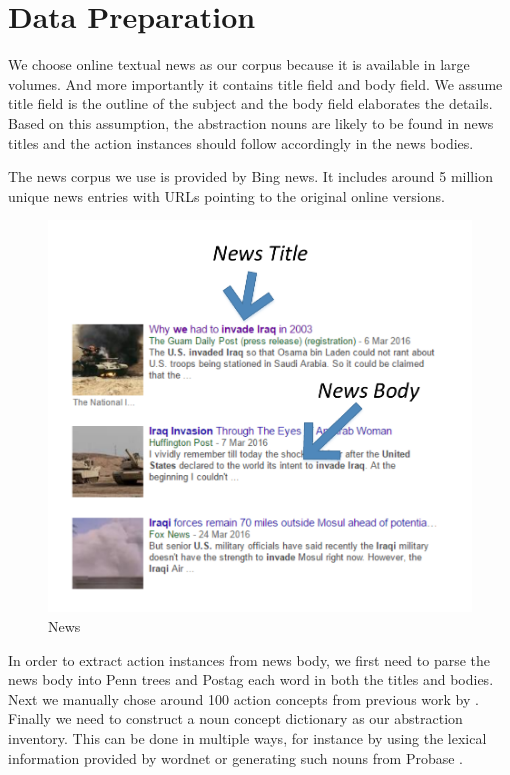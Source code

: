 \section{Data Preparation}
We choose online textual news as our corpus because it is available in large volumes. 
And more importantly it contains title field and body field. We assume title
field is the outline of the subject and the body field elaborates the details. 
Based on this assumption, the abstraction nouns are
likely to be found in news titles and the action instances should 
follow accordingly in the news bodies.

The news corpus we use is provided by Bing news. It includes around
5 million unique news entries with URLs pointing to the original 
online versions. 

\begin{figure}[h!]
\includegraphics[width=\linewidth]{img/ac3}
\caption{News}
\label{fig:news}
\end{figure}


In order to extract action instances from news body, we first need to 
parse the news body into Penn trees and Postag each word in both
the titles and bodies. Next we manually chose around 100 action concepts
from previous work by \cite{gong2015representing}. Finally we need to construct a noun
concept dictionary as our abstraction inventory. This can be done in 
multiple ways, for instance by using the lexical information provided by
wordnet \cite{wn} or generating such nouns from Probase \cite{wu2012probase}. 


